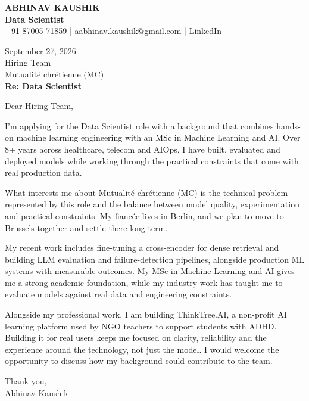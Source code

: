 \documentclass[10pt,a4paper]{article}
\begin{document}
\begin{center}
{\Large\bfseries ABHINAV KAUSHIK}\\[2pt]
{\bfseries Data Scientist}\\[2pt]
+91 87005 71859 \quad | \quad aabhinav.kaushik@gmail.com \quad | \quad LinkedIn
\end{center}
\vspace{8pt}
September 27, 2026\\[6pt]
Hiring Team\\
Mutualité chrétienne (MC)\\[4pt]
\textbf{Re: Data Scientist}

Dear Hiring Team,

I’m applying for the Data Scientist role with a background that combines hands-on machine learning engineering with an MSc in Machine Learning and AI. Over 8+ years across healthcare, telecom and AIOps, I have built, evaluated and deployed models while working through the practical constraints that come with real production data.

What interests me about Mutualité chrétienne (MC) is the technical problem represented by this role and the balance between model quality, experimentation and practical constraints. My fiancée lives in Berlin, and we plan to move to Brussels together and settle there long term.

My recent work includes fine-tuning a cross-encoder for dense retrieval and building LLM evaluation and failure-detection pipelines, alongside production ML systems with measurable outcomes. My MSc in Machine Learning and AI gives me a strong academic foundation, while my industry work has taught me to evaluate models against real data and engineering constraints.

Alongside my professional work, I am building ThinkTree.AI, a non-profit AI learning platform used by NGO teachers to support students with ADHD. Building it for real users keeps me focused on clarity, reliability and the experience around the technology, not just the model. I would welcome the opportunity to discuss how my background could contribute to the team.

Thank you,\\
Abhinav Kaushik
\end{document}
